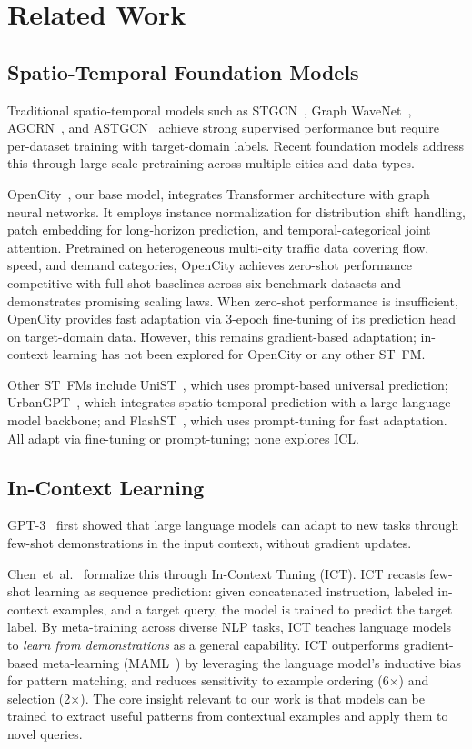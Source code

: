 \documentclass[conference]{IEEEtran}
\begin{document}
\section{Related Work}

\subsection{Spatio-Temporal Foundation Models}

Traditional spatio-temporal models such as STGCN~\cite{yu2018stgcn}, Graph WaveNet~\cite{wu2019graphwavenet}, AGCRN~\cite{bai2020agcrn}, and ASTGCN~\cite{guo2019astgcn} achieve strong supervised performance but require per-dataset training with target-domain labels.
Recent foundation models address this through large-scale pretraining across multiple cities and data types.

OpenCity~\cite{li2024opencity}, our base model, integrates Transformer architecture with graph neural networks.
It employs instance normalization for distribution shift handling, patch embedding for long-horizon prediction, and temporal-categorical joint attention.
Pretrained on heterogeneous multi-city traffic data covering flow, speed, and demand categories, OpenCity achieves zero-shot performance competitive with full-shot baselines across six benchmark datasets and demonstrates promising scaling laws.
When zero-shot performance is insufficient, OpenCity provides fast adaptation via 3-epoch fine-tuning of its prediction head on target-domain data.
However, this remains gradient-based adaptation; in-context learning has not been explored for OpenCity or any other ST~FM.

Other ST~FMs include UniST~\cite{yuan2024unist}, which uses prompt-based universal prediction; UrbanGPT~\cite{li2024urbangpt}, which integrates spatio-temporal prediction with a large language model backbone; and FlashST~\cite{li2024flashst}, which uses prompt-tuning for fast adaptation.
All adapt via fine-tuning or prompt-tuning; none explores ICL.

\subsection{In-Context Learning}

GPT-3~\cite{brown2020gpt3} first showed that large language models can adapt to new tasks through few-shot demonstrations in the input context, without gradient updates.

Chen~et~al.~\cite{chen2022ict} formalize this through In-Context Tuning (ICT).
ICT recasts few-shot learning as sequence prediction: given concatenated instruction, labeled in-context examples, and a target query, the model is trained to predict the target label.
By meta-training across diverse NLP tasks, ICT teaches language models to \textit{learn from demonstrations} as a general capability.
ICT outperforms gradient-based meta-learning (MAML~\cite{finn2017maml}) by leveraging the language model's inductive bias for pattern matching, and reduces sensitivity to example ordering (6$\times$) and selection (2$\times$).
The core insight relevant to our work is that models can be trained to extract useful patterns from contextual examples and apply them to novel queries.
\end{document}

